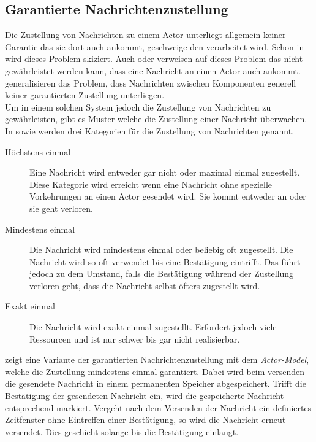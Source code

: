 \subsection{Garantierte Nachrichtenzustellung}\label{sec:actor:patterns:guaranteedDelivery}
Die Zustellung von Nachrichten zu einem Actor unterliegt allgemein keiner Garantie das sie dort auch ankommt, geschweige den verarbeitet wird. Schon in \cite{Agha1985ConcurrentParallelism} wird dieses Problem skiziert. Auch \cite{Vernon2015ReactiveAkka} oder \cite{CloudComputingPatterns2014} verweisen auf dieses Problem das nicht gewährleistet werden kann, dass eine Nachricht an einen Actor auch ankommt. \cite{CloudComputingPatterns2014} generalisieren das Problem, dass Nachrichten zwischen Komponenten generell keiner garantierten Zustellung unterliegen. \\
Um in einem solchen System jedoch die Zustellung von Nachrichten zu gewährleisten, gibt es Muster welche die Zustellung einer Nachricht überwachen. In \cite{messagedeliveryreliabilityakkadocumentation} sowie \cite{hughmckee_2017} werden drei Kategorien für die Zustellung von Nachrichten genannt.
\begin{description}
  \item [Höchstens einmal] Eine Nachricht wird entweder gar nicht oder maximal einmal zugestellt. Diese Kategorie wird erreicht wenn eine Nachricht ohne spezielle Vorkehrungen an einen Actor gesendet wird. Sie kommt entweder an oder sie geht verloren.
  \item [Mindestens einmal] Die Nachricht wird mindestens einmal oder beliebig oft zugestellt. Die Nachricht wird so oft verwendet bis eine Bestätigung eintrifft. Das führt jedoch zu dem Umstand, falls die Bestätigung während der Zustellung verloren geht, dass die Nachricht selbst öfters zugestellt wird.
  \item [Exakt einmal] Die Nachricht wird exakt einmal zugestellt. Erfordert jedoch viele Ressourcen und ist nur schwer bis gar nicht realisierbar.
\end{description}
\cite{Vernon2015ReactiveAkka} zeigt eine Variante der garantierten Nachrichtenzustellung mit dem \textit{Actor-Model}, welche die Zustellung mindestens einmal garantiert. Dabei wird beim versenden die gesendete Nachricht in einem permanenten Speicher abgespeichert. Trifft die Bestätigung der gesendeten Nachricht ein, wird die gespeicherte Nachricht entsprechend markiert. Vergeht nach dem Versenden der Nachricht ein definiertes Zeitfenster ohne Eintreffen einer Bestätigung, so wird die Nachricht erneut versendet. Dies geschieht solange bis die Bestätigung einlangt. \\
